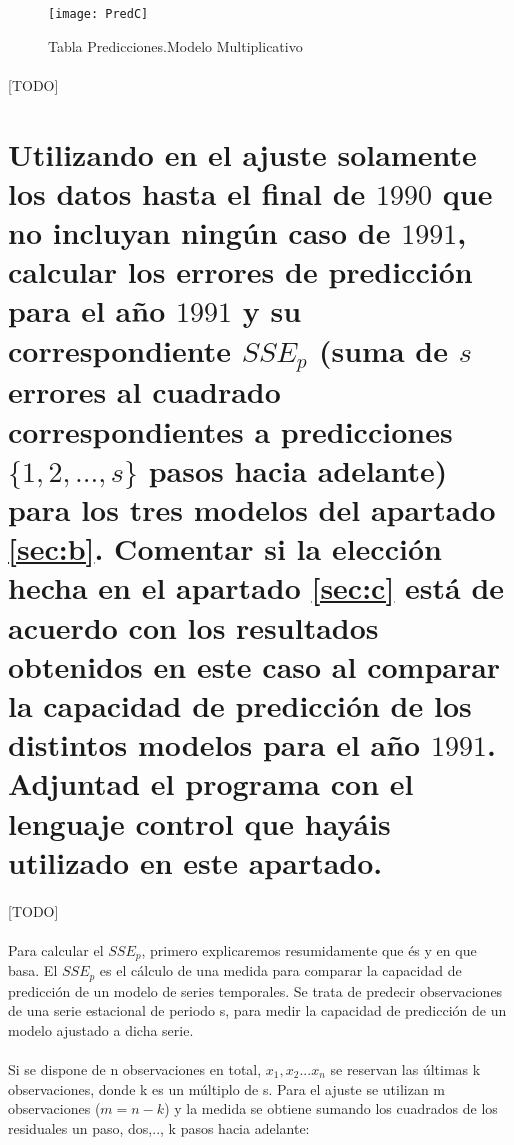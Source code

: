 \documentclass[a4paper, spanish]{article}
\begin{document}
    \begin{figure}[h!]
      \centering
      \texttt{[image: PredC]}
      \caption{Tabla Predicciones.Modelo Multiplicativo}
      \label{}
    \end{figure}

    \paragraph{}
    [TODO]

  \section{Utilizando en el ajuste solamente los datos hasta el final de $1990$ que no incluyan ningún caso de $1991$, calcular los errores de predicción para el año $1991$ y su correspondiente $SSE_p$ (suma de $s$ errores al cuadrado correspondientes a predicciones $\{1, 2, ..., s\}$ pasos hacia adelante) para los tres modelos del apartado \ref{sec:b}. Comentar si la elección hecha en el apartado \ref{sec:c} está de acuerdo con los resultados obtenidos en este caso al comparar la capacidad de predicción de los distintos modelos para el año $1991$. Adjuntad el programa con el lenguaje control que hayáis utilizado en este apartado.}
  \label{sec:d}

    \paragraph{}
    [TODO]

    \paragraph{}
    Para calcular el $SSE_p$, primero explicaremos resumidamente que és y en que basa. El $SSE_p$ es el cálculo de una medida para comparar la capacidad de predicción de un modelo de series temporales.
    Se trata de predecir observaciones de una serie estacional de periodo s, para
    medir la capacidad de predicción de un modelo ajustado a dicha serie.

    \paragraph{}
    Si se dispone de n observaciones en total, $x_1,x_2...x_n$ se reservan las últimas k observaciones, donde k es un múltiplo de s. Para el ajuste se utilizan m observaciones ($m = n - k$) y la medida se obtiene sumando los cuadrados de los
    residuales un paso, dos,.., k pasos hacia adelante:
\end{document}
